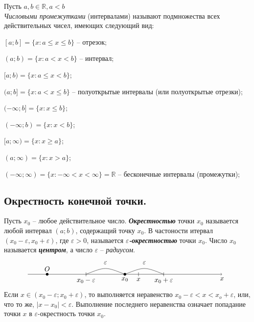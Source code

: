 \documentclass[12pt, fleqn]{article}
\begin{document}
	Пусть $a, b \in \mathbb{R}, a < b$\\
	\textit{Числовыми промежутками} (интервалами) называют подмножества всех действительных чисел, имеющих следующий вид: 
	\begin{description}
		\item $[a;b]=\{x\colon  a \leq x \leq b\}$ -- отрезок;
		\item $(a;b)=\{x\colon  a < x < b\}$ -- интервал;
		\item $[a;b)=\{x\colon a \leq x < b\}$;
		\item $(a;b]=\{x\colon a < x \leq b\}$ -- полуоткрытые интервалы (или полуоткрытые отрезки);
		\item $(-\infty;b]=\{x\colon x\leq b\}$;
		\item $(-\infty;b)=\{x\colon x<b\}$;
		\item $[a;\infty)=\{x\colon  x\geq a\}$;
		\item $(a;\infty)=\{x\colon  x> a\}$;
		\item $(-\infty;\infty)=\{x\colon  -\infty < x < \infty\} = \mathbb{R}$ -- бесконечные интервалы (промежутки);
	\end{description}
	\subsection{Окрестность конечной точки.}
	Пусть $x_0$ -- любое действительное число. \textbf{\textit{Окрестностью}} точки $x_0$ называется любой интервал $(a;b)$, содержащий точку $x_0$. В частоности итервал $(x_0-\varepsilon, x_0+\varepsilon)$, где $\varepsilon > 0$, называется \textbf{\textit{$\varepsilon$-окрестностью}} точки $x_0$. Число $x_0$ называется \textbf{\textit{центром}}, а число $\varepsilon$ -- \textit{радиусом}.
	$$\begin{tikzpicture}
		\draw (3,0) .. controls (4,0.4) .. (5,0);
		\draw (4,0.4)node[above]{$\varepsilon$};
		\draw (7,0) .. controls (6,0.4) .. (5,0);
		\draw (6,0.4)node[above]{$\varepsilon$};
		\draw (5.7,0.1) -- (5.7,-0.1) node[below=-0.9]{$x$}
		 (3,0.1)--(3,-0.1) node[below=-0.9]{$x_0-\varepsilon$}
		 (7,0.1)--(7,-0.1) node[below=-0.9]{$x_0+\varepsilon$}
		 [->] (0,0) -- (10,0) node[below=1] {$x$} coordinate(x axis);
		\fill (1, 0) circle (2pt) node[above=1] {$O$}
		 (5,0) circle (2pt) node [below=1]{$x_0$};		
	\end{tikzpicture}$$
	Если $x \in (x_0-\varepsilon;x_0+\varepsilon)$, то выполняется неравенство $x_0 - \varepsilon<x<x_o+\varepsilon$, или, что то же, $|x-x_0|<\varepsilon$. Выполнение последнего неравенства означает попадание точки $x$ в $\varepsilon$-окрестность точки $x_0$.
\end{document}
